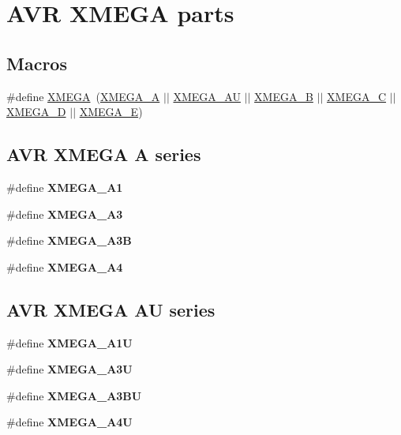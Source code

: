 \hypertarget{group__xmega__part__macros__group}{}\section{A\+V\+R X\+M\+E\+G\+A parts}
\label{group__xmega__part__macros__group}
\subsection*{Macros}
\begin{DoxyCompactItemize}
\item 
\#define \hyperlink{group__xmega__part__macros__group_ga959bff90afbae437308a52eeb67b3368}{X\+M\+E\+G\+A}~(\hyperlink{group__xmega__part__macros__group_gab903a90d3a0bc99d7248eaecbb325a23}{X\+M\+E\+G\+A\+\_\+\+A} $\vert$$\vert$ \hyperlink{group__xmega__part__macros__group_ga55210f3805902072fce76647b50fa177}{X\+M\+E\+G\+A\+\_\+\+A\+U} $\vert$$\vert$ \hyperlink{group__xmega__part__macros__group_ga62f2c1c93640237425cb64186ddce219}{X\+M\+E\+G\+A\+\_\+\+B} $\vert$$\vert$ \hyperlink{group__xmega__part__macros__group_ga75b06dd59d29b1de54dd73fe67830973}{X\+M\+E\+G\+A\+\_\+\+C} $\vert$$\vert$ \hyperlink{group__xmega__part__macros__group_gacc9e4b074c3f87ce7b461483b0beb15c}{X\+M\+E\+G\+A\+\_\+\+D} $\vert$$\vert$ \hyperlink{group__xmega__part__macros__group_gaab6d2543c5128fca0b1aeecb5c080723}{X\+M\+E\+G\+A\+\_\+\+E})
\end{DoxyCompactItemize}
\subsection*{A\+V\+R X\+M\+E\+G\+A A series}
\begin{DoxyCompactItemize}
\item 
\#define {\bfseries X\+M\+E\+G\+A\+\_\+\+A1}
\item 
\#define {\bfseries X\+M\+E\+G\+A\+\_\+\+A3}
\item 
\#define {\bfseries X\+M\+E\+G\+A\+\_\+\+A3\+B}
\item 
\#define {\bfseries X\+M\+E\+G\+A\+\_\+\+A4}
\end{DoxyCompactItemize}
\subsection*{A\+V\+R X\+M\+E\+G\+A A\+U series}
\begin{DoxyCompactItemize}
\item 
\#define {\bfseries X\+M\+E\+G\+A\+\_\+\+A1\+U}
\item 
\#define {\bfseries X\+M\+E\+G\+A\+\_\+\+A3\+U}
\item 
\#define {\bfseries X\+M\+E\+G\+A\+\_\+\+A3\+B\+U}
\item 
\#define {\bfseries X\+M\+E\+G\+A\+\_\+\+A4\+U}
\end{DoxyCompactItemize}
